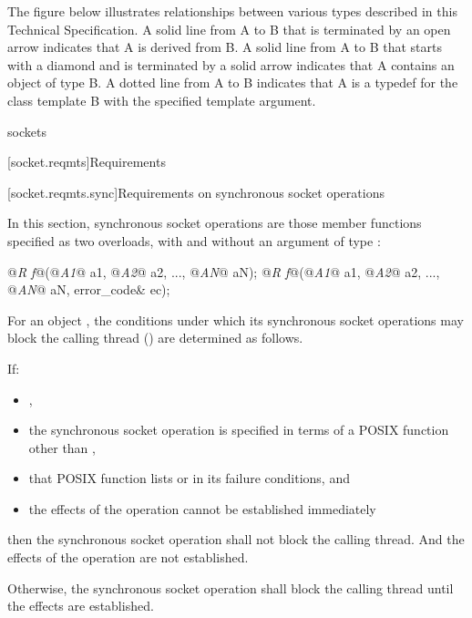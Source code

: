\pnum
The figure below illustrates relationships between various types described in this Technical Specification. A solid line from A to B that is terminated by an open arrow indicates that A is derived from B. A solid line from A to B that starts with a diamond and is terminated by a solid arrow indicates that A contains an object of type B. A dotted line from A to B indicates that A is a typedef for the class template B with the specified template argument.

\pnum
sockets



[socket.reqmts]{Requirements}


[socket.reqmts.sync]{Requirements on synchronous socket operations}

\pnum
In this section, synchronous socket operations are those member functions specified as two overloads, with and without an argument of type :

\begin{codeblock}
@\textit{R f}@(@\textit{A1}@ a1, @\textit{A2}@ a2, ..., @\textit{AN}@ aN);
@\textit{R f}@(@\textit{A1}@ a1, @\textit{A2}@ a2, ..., @\textit{AN}@ aN, error_code& ec);
\end{codeblock}

\pnum
For an object , the conditions under which its synchronous socket operations may block the calling thread () are determined as follows.

\pnum
If:

\begin{itemize}
\item
{},
\item
the synchronous socket operation is specified in terms of a POSIX function other than ,
\item
that POSIX function lists  or  in its failure conditions, and
\item
the effects of the operation cannot be established immediately
\end{itemize}

then the synchronous socket operation shall not block the calling thread. \enternote And the effects of the operation are not established. \exitnote

\pnum
Otherwise, the synchronous socket operation shall block the calling thread until the effects are established.



